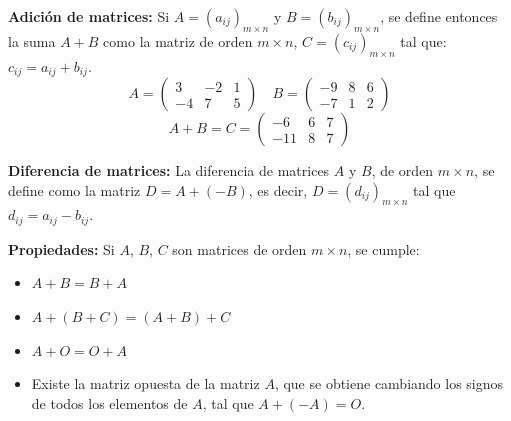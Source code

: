 \documentclass[11pt,a4paper]{article}
\newcommand{\hl}[1]{\textcolor{resaltado}{#1}}
\begin{document}
\begin{minipage}[t]{0.485\textwidth}
\textbf{Adición de matrices:} Si $A = (a_{ij})_{m\times n}$ y $B = (b_{ij})_{m\times n}$, se
define entonces la suma $A + B$ como la matriz de orden $m\times n$,
$C = (c_{ij})_{m\times n}$ tal que: \hl{$c_{ij} = a_{ij} + b_{ij}$}.
\[
A = \begin{pmatrix} 3 & -2 & 1\\ -4 & 7 & 5\end{pmatrix}
\quad
B = \begin{pmatrix} -9 & 8 & 6\\ -7 & 1 & 2\end{pmatrix}
\]
\[
A + B = C = \begin{pmatrix} -6 & 6 & 7\\ -11 & 8 & 7\end{pmatrix}
\]
\end{minipage}\hfill
\begin{minipage}[t]{0.485\textwidth}
\textbf{Diferencia de matrices:} La diferencia de matrices $A$ y $B$, de orden $m\times n$,
se define como la matriz $D = A + (-B)$, es decir, $D = (d_{ij})_{m\times n}$ tal que
\hl{$d_{ij} = a_{ij} - b_{ij}$}.

\textbf{Propiedades:} Si $A$, $B$, $C$ son matrices de orden $m\times n$, se cumple:
\begin{itemize}[label=\textcolor{naranja}{\checkmark}]
  \item $A + B = B + A$
  \item $A + (B + C) = (A + B) + C$
  \item $A + O = O + A$
  \item Existe la matriz opuesta de la matriz $A$, que se obtiene cambiando los signos de
  todos los elementos de $A$, tal que $A + (-A) = O$.
\end{itemize}
\end{minipage}
\end{document}
